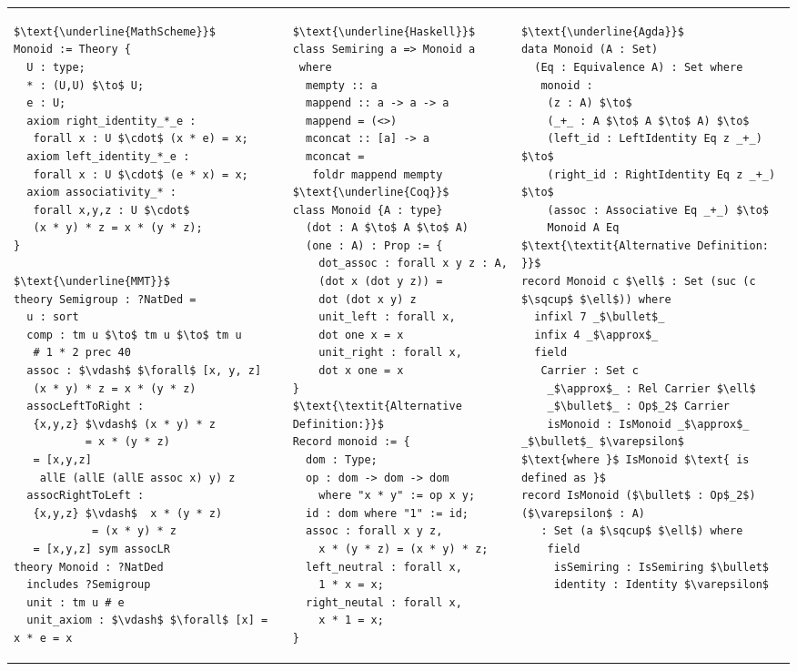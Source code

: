 \footnotesize
\begin{adjustbox}{width=1.2\columnwidth,center}
\begin{tabular}{p{7cm} p{7cm} p{7cm}}  
\begin{lstlisting}[mathescape]
$\text{\underline{MathScheme}}$
Monoid := Theory { 
  U : type; 
  * : (U,U) $\to$ U; 
  e : U; 
  axiom right_identity_*_e : 
   forall x : U $\cdot$ (x * e) = x;
  axiom left_identity_*_e :  
   forall x : U $\cdot$ (e * x) = x;
  axiom associativity_* : 
   forall x,y,z : U $\cdot$ 
   (x * y) * z = x * (y * z); 
}

$\text{\underline{MMT}}$
theory Semigroup : ?NatDed = 
  u : sort 
  comp : tm u $\to$ tm u $\to$ tm u 
   # 1 * 2 prec 40
  assoc : $\vdash$ $\forall$ [x, y, z]
   (x * y) * z = x * (y * z)    
  assocLeftToRight : 
   {x,y,z} $\vdash$ (x * y) * z 
           = x * (y * z) 
   = [x,y,z] 
    allE (allE (allE assoc x) y) z
  assocRightToLeft : 
   {x,y,z} $\vdash$  x * (y * z) 
            = (x * y) * z 
   = [x,y,z] sym assocLR 
theory Monoid : ?NatDed 
  includes ?Semigroup 
  unit : tm u # e 
  unit_axiom : $\vdash$ $\forall$ [x] = x * e = x       
\end{lstlisting}       
&
\begin{lstlisting}[mathescape]
$\text{\underline{Haskell}}$
class Semiring a => Monoid a 
 where 
  mempty :: a 
  mappend :: a -> a -> a 
  mappend = (<>) 
  mconcat :: [a] -> a 
  mconcat = 
   foldr mappend mempty 
$\text{\underline{Coq}}$
class Monoid {A : type}
  (dot : A $\to$ A $\to$ A)
  (one : A) : Prop := {
    dot_assoc : forall x y z : A, 
    (dot x (dot y z)) = 
    dot (dot x y) z
    unit_left : forall x, 
    dot one x = x 
    unit_right : forall x, 
    dot x one = x              
}
$\text{\textit{Alternative Definition:}}$
Record monoid := {
  dom : Type; 
  op : dom -> dom -> dom 
    where "x * y" := op x y; 
  id : dom where "1" := id; 
  assoc : forall x y z, 
    x * (y * z) = (x * y) * z; 
  left_neutral : forall x,   
    1 * x = x; 
  right_neutal : forall x,
    x * 1 = x; 
}
\end{lstlisting}
&
\begin{lstlisting}[mathescape]
$\text{\underline{Agda}}$
data Monoid (A : Set) 
  (Eq : Equivalence A) : Set where 
   monoid : 
    (z : A) $\to$ 
    (_+_ : A $\to$ A $\to$ A) $\to$
    (left_id : LeftIdentity Eq z _+_) $\to$ 
    (right_id : RightIdentity Eq z _+_) $\to$
    (assoc : Associative Eq _+_) $\to$
    Monoid A Eq 
$\text{\textit{Alternative Definition: }}$
record Monoid c $\ell$ : Set (suc (c $\sqcup$ $\ell$)) where 
  infixl 7 _$\bullet$_
  infix 4 _$\approx$_
  field 
   Carrier : Set c 
    _$\approx$_ : Rel Carrier $\ell$ 
    _$\bullet$_ : Op$_2$ Carrier 
    isMonoid : IsMonoid _$\approx$_ _$\bullet$_ $\varepsilon$ 
$\text{where }$ IsMonoid $\text{ is defined as }$
record IsMonoid ($\bullet$ : Op$_2$) ($\varepsilon$ : A) 
   : Set (a $\sqcup$ $\ell$) where 
    field 
     isSemiring : IsSemiring $\bullet$ 
     identity : Identity $\varepsilon$ 
    

\end{lstlisting}
\end{tabular}
\end{adjustbox}
